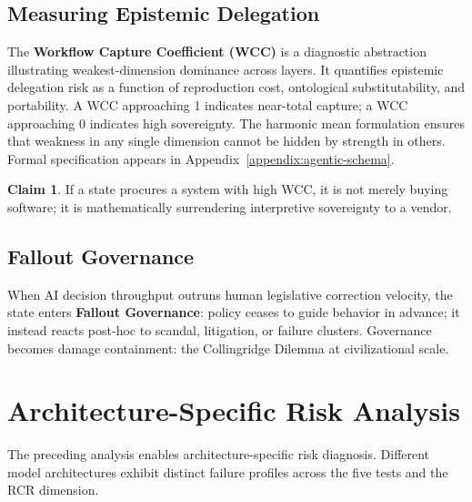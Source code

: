 \documentclass[11pt,a4paper]{article}
\theoremstyle{definition}
\newtheorem{claim}{Claim}[section]
\begin{document}
\subsection{Measuring Epistemic Delegation}

The \textbf{Workflow Capture Coefficient (WCC)} is a diagnostic abstraction illustrating weakest-dimension dominance across layers. It quantifies epistemic delegation risk as a function of reproduction cost, ontological substitutability, and portability. A WCC approaching 1 indicates near-total capture; a WCC approaching 0 indicates high sovereignty. The harmonic mean formulation ensures that weakness in any single dimension cannot be hidden by strength in others. Formal specification appears in Appendix~\ref{appendix:agentic-schema}.

\begin{claim}
If a state procures a system with high WCC, it is not merely buying software; it is mathematically surrendering interpretive sovereignty to a vendor.
\end{claim}

\subsection{Fallout Governance}

When AI decision throughput outruns human legislative correction velocity, the state enters \textbf{Fallout Governance}: policy ceases to guide behavior in advance; it instead reacts post-hoc to scandal, litigation, or failure clusters. Governance becomes damage containment: the Collingridge Dilemma at civilizational scale.


\section{Architecture-Specific Risk Analysis}
\label{sec:architecture}

The preceding analysis enables architecture-specific risk diagnosis. Different model architectures exhibit distinct failure profiles across the five tests and the RCR dimension.
\end{document}
